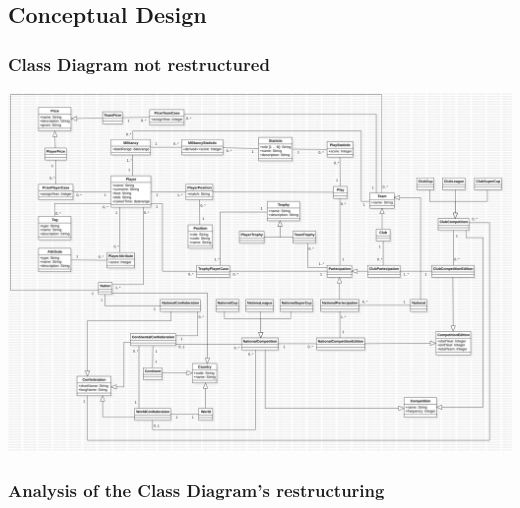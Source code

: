 \subsection{Conceptual Design}

\newpage

\subsubsection{Class Diagram not restructured}

\includegraphics[width=\textwidth]{res/class_diagram_not_restr}
\newpage

\subsubsection{Analysis of the Class Diagram's restructuring}
\newpage
